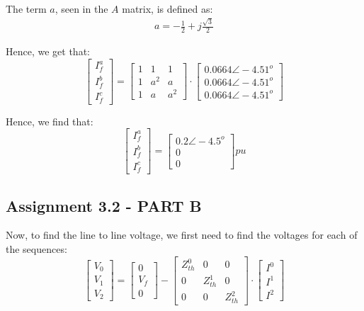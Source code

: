 \documentclass{article}
\begin{document}
The term $a$, seen in the $A$ matrix, is defined as:
\begin{align*}
	a = -\frac{1}{2} + j\frac{\sqrt{3}}{2}
\end{align*}

Hence, we get that:
\[
\begin{bmatrix}
I^a_f\\I^b_f\\I^c_f
\end{bmatrix}
=
\begin{bmatrix}
1 & 1 & 1\\
1 & a^2 & a\\
1 & a & a^2
\end{bmatrix}
\cdot
\begin{bmatrix}
0.0664 \angle -4.51^o\\0.0664 \angle -4.51^o\\0.0664 \angle -4.51^o
\end{bmatrix}
\]

Hence, we find that:
\[
\begin{bmatrix}
I^a_f\\I^b_f\\I^c_f
\end{bmatrix}
=
\begin{bmatrix}
0.2 \angle -4.5^o\\
0\\
0
\end{bmatrix}
\si{pu}
\]
\subsection{Assignment 3.2 - PART B}
Now, to find the line to line voltage, we first need to find the voltages for each of the sequences:
\[
\begin{bmatrix}
V_0\\V_1\\V_2
\end{bmatrix}
=
\begin{bmatrix}
0\\V_f\\0
\end{bmatrix}
-
\begin{bmatrix}
Z^0_{th} & 0 & 0\\
0 & Z^1_{th} & 0\\
0 & 0 & Z^2_{th}
\end{bmatrix}
\cdot
\begin{bmatrix}
I^0\\I^1\\I^2
\end{bmatrix}
\]
\end{document}
